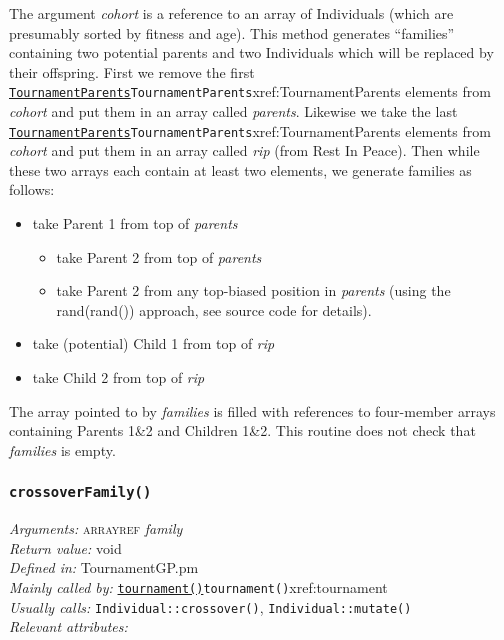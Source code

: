\documentclass[a4paper]{article}
\begin{document}
The argument \textit{cohort} is a reference to an array of Individuals
(which are presumably sorted by fitness and age).  This method
generates ``families'' containing two potential parents and two
Individuals which will be replaced by their offspring.  First we
remove the first \hyperref[no]{\texttt{TournamentParents}}{\texttt{TournamentParents}}{xref:TournamentParents} elements from
\textit{cohort} and put them in an array called \textit{parents}.
Likewise we take the last \hyperref[no]{\texttt{TournamentParents}}{\texttt{TournamentParents}}{xref:TournamentParents} elements from
\textit{cohort} and put them in an array called \textit{rip} (from Rest In
Peace).  Then while these two arrays each contain at least two elements, we
generate families as follows:
\begin{itemize}
\item take Parent 1 from top of \textit{parents}
\begin{itemize}
\item{} take Parent 2 from top of \textit{parents}
\item{} take Parent 2 from any
top-biased position in \textit{parents} (using the
rand(rand()) approach, see source code for details).
\end{itemize}
\item take (potential) Child 1 from top of \textit{rip}
\item take Child 2 from top of \textit{rip}
\end{itemize}

The array pointed to by \textit{families} is filled with references to
four-member arrays containing Parents 1\&2 and Children 1\&2.  This
routine does not check that \textit{families} is empty.

\subsubsection{\texttt{crossoverFamily()}}\label{xref:crossoverFamily}
\begin{flushleft}
\textit{Arguments:} \textsc{arrayref} \textit{family}\\
\textit{Return value:} void\\
\textit{Defined in:} TournamentGP.pm\\
\textit{Mainly called by:} \hyperref[no]{\texttt{tournament()}}{\texttt{tournament()}}{xref:tournament}\\
\textit{Usually calls:} \texttt{Individual::crossover()}, \texttt{Individual::mutate()}\\
\textit{Relevant attributes:}
\end{flushleft}
\end{document}
